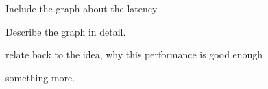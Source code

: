 Include the graph about the latency

Describe the graph in detail.

relate back to the idea, why this performance is good enough

something more.